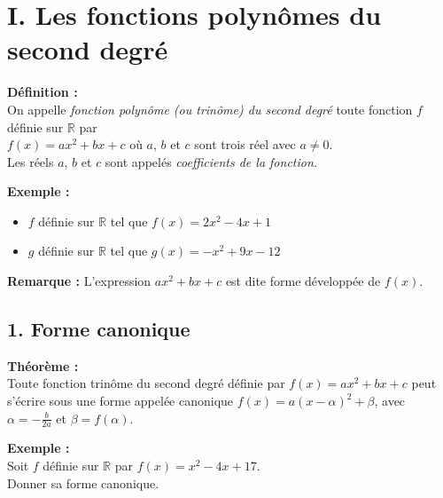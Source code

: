 \documentclass[11pt,a4paper]{article}
\title{\titre}
\author{\classe \\ \theme}
\date{}
\begin{document}
\maketitle
\pagestyle{custom}
\thispagestyle{custom}

\section*{I. Les fonctions polynômes du second degré}

\begin{mdframed}[style=definitionStyle]
	\textbf{Définition :} ~\\
	On appelle \emph{fonction polynôme (ou trinôme) du second degré} toute fonction $f$ définie sur $\mathbb{R}$ par ~\\
	$f(x)=ax^2+bx+c$ où $a$, $b$ et $c$ sont trois réel avec $a\not=0$. \\
	Les réels $a$, $b$ et $c$ sont appelés \emph{coefficients de la fonction.}
\end{mdframed}

\textbf{Exemple :}
\vspace{-6pt}
\begin{itemize}
	\item $f$ définie sur $\mathbb{R}$ tel que $f(x)=2x^2-4x+1$
	\item $g$ définie sur $\mathbb{R}$ tel que $g(x)=-x^2+9x-12$
\end{itemize}

\textbf{Remarque :} L'expression $ax^2+bx+c$ est dite forme développée de $f(x)$.

\subsection*{1. Forme canonique}

\begin{mdframed}[style=proprieteStyle]
	\textbf{Théorème :} ~\\
	Toute fonction trinôme du second degré définie par $f(x)=ax^2+bx+c$ peut s'écrire sous une forme appelée
	canonique $f(x)=a(x-\alpha)^2+\beta$, avec $\alpha=-\frac{b}{2a}$ et $\beta=f(\alpha)$.
\end{mdframed}

\textbf{Exemple :} \\

Soit $f$ définie sur $\mathbb{R}$ par $f(x)=x^2-4x+17$. \\
Donner sa forme canonique.
\end{document}
